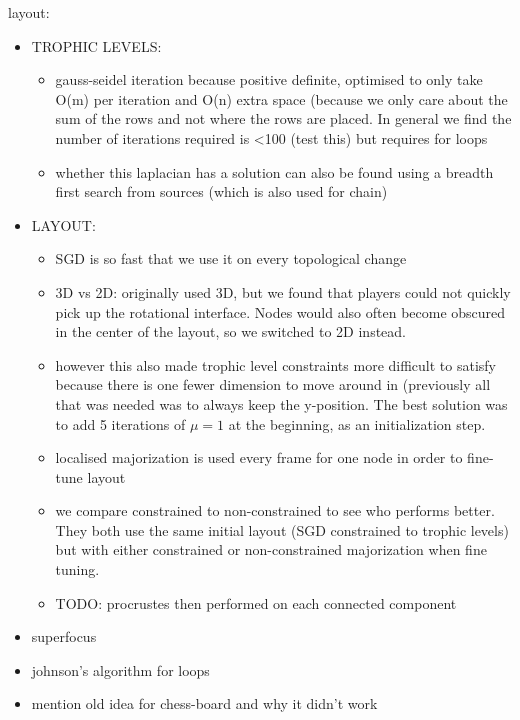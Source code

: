 layout:
\begin{itemize}
    \item TROPHIC LEVELS:
    \begin{itemize}
        \item gauss-seidel iteration because positive definite, optimised to only take O(m) per iteration and O(n) extra space (because we only care about the sum of the rows and not where the rows are placed. In general we find the number of iterations required is <100 (test this) but requires for loops~\cite{TODO: oliviasimpsonpaper}
        \item whether this laplacian has a solution can also be found using a breadth first search from sources (which is also used for chain)
    \end{itemize}
    \item LAYOUT:
    \begin{itemize}
        \item SGD is so fast that we use it on every topological change
        \item 3D vs 2D: originally used 3D, but we found that players could not quickly pick up the rotational interface. Nodes would also often become obscured in the center of the layout, so we switched to 2D instead. 
        \item however this also made trophic level constraints more difficult to satisfy because there is one fewer dimension to move around in (previously all that was needed was to always keep the y-position. The best solution was to add 5 iterations of $\mu=1$ at the beginning, as an initialization step.
        \item localised majorization is used every frame for one node in order to fine-tune layout
        \item we compare constrained to non-constrained to see who performs better. They both use the same initial layout (SGD constrained to trophic levels) but with either constrained or non-constrained majorization when fine tuning.
        \item TODO: procrustes then performed on each connected component
    \end{itemize}
    
    \item superfocus
    \item johnson's algorithm for loops
    \item mention old idea for chess-board and why it didn't work
\end{itemize}

